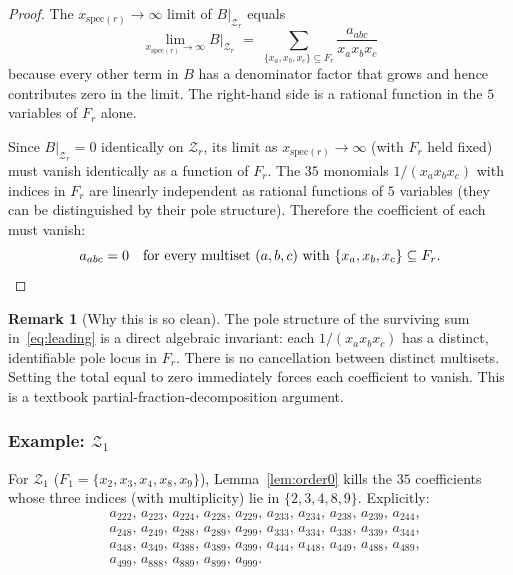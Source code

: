 \documentclass[11pt]{article}
\newcommand{\Z}{\mathcal{Z}}
\newcommand{\spec}{\mathrm{spec}}
\theoremstyle{definition}
\newtheorem*{remark}{Remark}
\begin{document}
\begin{proof}
The $x_{\spec(r)}\to\infty$ limit of $B|_{\Z_r}$ equals
\begin{equation}
\label{eq:leading}
\lim_{x_{\spec(r)}\to\infty} B|_{\Z_r}
\;=\;\sum_{\{x_a,x_b,x_c\}\subseteq F_r}\frac{a_{abc}}{x_a x_b x_c}
\end{equation}
because every other term in $B$ has a denominator factor that grows and hence
contributes zero in the limit. The right-hand side is a rational function in
the $5$ variables of $F_r$ alone.

Since $B|_{\Z_r}=0$ identically on $\Z_r$, its limit as $x_{\spec(r)}\to\infty$
(with $F_r$ held fixed) must vanish identically as a function of $F_r$. The $35$
monomials $1/(x_a x_b x_c)$ with indices in $F_r$ are linearly independent
as rational functions of $5$ variables (they can be distinguished by their
pole structure). Therefore the coefficient of each must vanish:
\[
a_{abc}=0\quad\text{for every multiset}\ (a,b,c)\ \text{with}\ \{x_a,x_b,x_c\}\subseteq F_r.
\qedhere
\]
\end{proof}

\begin{remark}[Why this is so clean]
The pole structure of the surviving sum in~\eqref{eq:leading} is a direct
algebraic invariant: each $1/(x_a x_b x_c)$ has a distinct, identifiable
pole locus in $F_r$. There is no cancellation between distinct multisets.
Setting the total equal to zero immediately forces each coefficient to vanish.
This is a textbook partial-fraction-decomposition argument.
\end{remark}

\subsubsection*{Example: $\Z_1$}

For $\Z_1$ ($F_1=\{x_2,x_3,x_4,x_8,x_9\}$), Lemma~\ref{lem:order0} kills the
$35$ coefficients whose three indices (with multiplicity) lie in
$\{2,3,4,8,9\}$. Explicitly:
\[
\begin{aligned}
&a_{222},\,a_{223},\,a_{224},\,a_{228},\,a_{229},\,
a_{233},\,a_{234},\,a_{238},\,a_{239},\,a_{244},\\
&a_{248},\,a_{249},\,a_{288},\,a_{289},\,a_{299},\,
a_{333},\,a_{334},\,a_{338},\,a_{339},\,a_{344},\\
&a_{348},\,a_{349},\,a_{388},\,a_{389},\,a_{399},\,
a_{444},\,a_{448},\,a_{449},\,a_{488},\,a_{489},\\
&a_{499},\,a_{888},\,a_{889},\,a_{899},\,a_{999}.
\end{aligned}
\]
\end{document}
